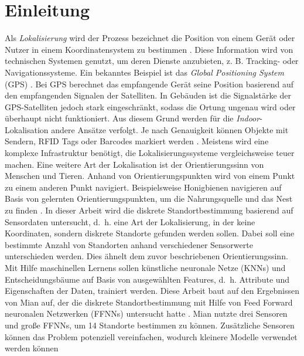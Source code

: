 \chapter{Einleitung}
Als \textit{Lokalisierung} wird der Prozess bezeichnet die Position von einem Gerät oder Nutzer in einem Koordinatensystem zu bestimmen \cite{bulusu2000gps}.
Diese Information wird von technischen Systemen genutzt, um deren Dienste anzubieten, z. B. Tracking- oder Navigationssysteme.
Ein bekanntes Beispiel ist das \textit{Global Positioning System} (GPS) \cite{kaplan2005understanding}.
Bei GPS berechnet das empfangende Gerät seine Position basierend auf den empfangenden Signalen der Satelliten.
\newline
\newline
In Gebäuden ist die Signalstärke der GPS-Satelliten jedoch stark eingeschränkt, sodass die Ortung ungenau wird oder überhaupt nicht funktioniert.
Aus diesem Grund werden für die \textit{Indoor}-Lokalisation andere Ansätze verfolgt.
Je nach Genauigkeit können Objekte mit Sendern, RFID Tags oder Barcodes markiert werden \cite{xiao2016survey}.
Meistens wird eine komplexe Infrastruktur benötigt, die Lokalisierungssysteme vergleichsweise teuer machen.
\newline
\newline
Eine weitere Art der Lokalisation ist der Orientierungssinn von Menschen und Tieren.
Anhand von Orientierungspunkten wird von einem Punkt zu einem anderen Punkt navigiert.
Beispielsweise Honigbienen navigieren auf Basis von gelernten Orientierungspunkten, um die Nahrungsquelle und das Nest zu finden \cite{menzel1996knowledge}.
\newline
\newline
In dieser Arbeit wird die diskrete Standortbestimmung basierend auf Sensordaten untersucht,
d.~h. eine Art der Lokalisierung, in der keine Koordinaten, sondern diskrete Standorte gefunden werden sollen.
Dabei soll eine bestimmte Anzahl von Standorten anhand verschiedener Sensorwerte unterschieden werden.
Dies ähnelt dem zuvor beschriebenen Orientierungssinn.
Mit Hilfe maschinellen Lernens sollen künstliche neuronale Netze (KNNs) und Entscheidungsbäume
auf Basis von ausgewählten Features, d.~h. Attribute und Eigenschaften der Daten, trainiert werden.
Diese Arbeit baut auf den Ergebnissen von Mian auf, der die diskrete Standortbestimmung mit Hilfe von
Feed Forward neuronalen Netzwerken (FFNNs) untersucht hatte \cite{naveedThesis}.
\newpage
Mian nutzte drei Sensoren und große FFNNs, um 14 Standorte bestimmen zu können.
Zusätzliche Sensoren können das Problem potenziell vereinfachen, wodurch kleinere Modelle verwendet werden können
